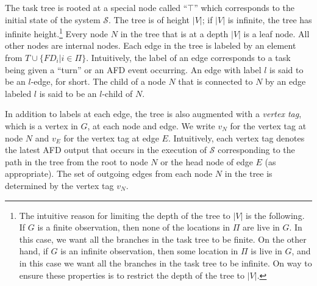 \documentclass[11pt]{article}
\numberwithin{theorem}{section}
\begin{document}
The task tree is rooted at a special node called ``$\top$'' which
corresponds to the initial state of the system $\mathcal{S}$.
The tree is of height $|V|$; if $|V|$ is infinite, the tree has infinite height.\footnote{The intuitive reason for limiting the depth of the tree to $|V|$ is the following.
If $G$ is a finite observation, then none of the locations in $\Pi$ are live in $G$. In this case, we want all the branches in the task tree to be finite.
	On the other hand, if $G$ is an infinite observation, then some location in $\Pi$ is live in $G$, and in this case we want all the branches in the task tree to be infinite.
	On way to ensure these properties is to restrict the depth of the tree to $|V|$.} 
Every node $N$ in the tree that is at a depth $|V|$ is a leaf
node. All other nodes are internal nodes. 
Each edge in the tree is labeled by an element from $T \cup \{FD_{i} |
i \in \Pi\}$. 
Intuitively, the label of an edge corresponds to a task being given a
``turn'' or an AFD event occurring. 
An edge with label $l$ is said to be an $l$-edge, for short. 
The child of a node $N$ that is connected to $N$ by an edge labeled
$l$ is said to be an $l$-child of $N$.

In addition to labels at each edge, the tree is also augmented with
a \emph{vertex tag}, which is a vertex in $G$, at each node and edge. 
We write $v_N$ for the vertex tag at node $N$ and $v_E$ for the vertex
tag at edge $E$. Intuitively, each vertex tag denotes the latest
AFD output that occurs in the execution of $\mathcal{S}$ corresponding to 
the path in the tree from the root to node $N$ or the head node of edge $E$ (as appropriate).
The set of outgoing edges from each node $N$ in the tree is determined by the vertex tag $v_N$. 
\end{document}
